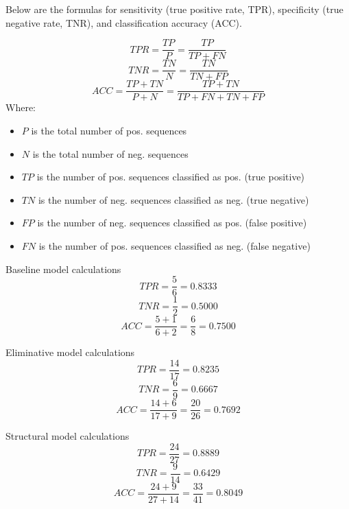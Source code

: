 Below are the formulas for sensitivity (true positive rate, TPR), specificity (true negative rate, TNR), and classification accuracy (ACC).

\begin{equation}
    TPR = \frac{TP}{P} = \frac{TP}{TP + FN}
\end{equation}
\begin{equation}
    TNR = \frac{TN}{N} = \frac{TN}{TN + FP}
\end{equation}
\begin{equation}
    ACC = \frac{TP + TN}{P + N} = \frac{TP + TN}{TP + FN + TN + FP}
\end{equation}
Where:
\begin{itemize}
    \setlength\itemsep{0em}
    \item $P$ is the total number of pos. sequences
    \item $N$ is the total number of neg. sequences
    \item $TP$ is the number of pos. sequences classified as pos. (true positive)
    \item $TN$ is the number of neg. sequences classified as neg. (true negative)
    \item $FP$ is the number of neg. sequences classified as pos. (false positive)
    \item $FN$ is the number of pos. sequences classified as neg. (false negative)
\end{itemize}

\vspace{1em}

Baseline model calculations
\[ TPR = \frac{5}{6} = 0.8333 \]
\[ TNR = \frac{1}{2} = 0.5000 \]
\[ ACC = \frac{5 + 1}{6 + 2} = \frac{6}{8} = 0.7500 \]

\vspace{1em}

Eliminative model calculations
\[ TPR = \frac{14}{17} = 0.8235 \]
\[ TNR = \frac{6}{9} = 0.6667 \]
\[ ACC = \frac{14 + 6}{17 + 9} = \frac{20}{26} = 0.7692 \]

\vspace{1em}

Structural model calculations
\[ TPR = \frac{24}{27} = 0.8889 \]
\[ TNR = \frac{9}{14} = 0.6429 \]
\[ ACC = \frac{24 + 9}{27 + 14} = \frac{33}{41} = 0.8049 \]
